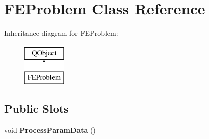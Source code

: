 \hypertarget{class_f_e_problem}{}\section{F\+E\+Problem Class Reference}
\label{class_f_e_problem}
Inheritance diagram for F\+E\+Problem\+:\begin{figure}[H]
\begin{center}
\leavevmode
\includegraphics[height=2.000000cm]{class_f_e_problem}
\end{center}
\end{figure}
\subsection*{Public Slots}
\begin{DoxyCompactItemize}
\item 
void {\bfseries Process\+Param\+Data} ()\hypertarget{class_f_e_problem_a39624db202a3e8eb5de7e23312852c03}{}\label{class_f_e_problem_a39624db202a3e8eb5de7e23312852c03}

\end{DoxyCompactItemize}
